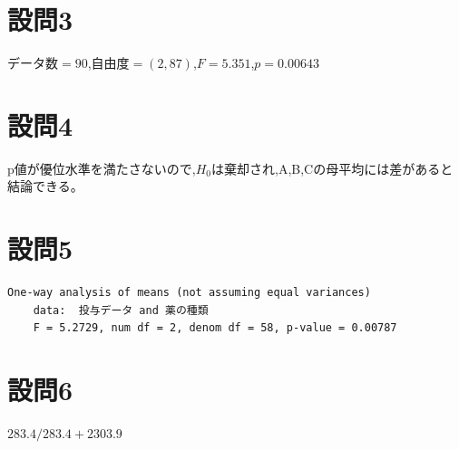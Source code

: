 \documentclass[fontsize = 10pt, paper= a4,twocolumn,column_gap=5zw]{jlreq}
\begin{document}
\section{設問3}
$ データ数 = 90$,$自由度 = (2,87) $,$F = 5.351$,$ p = 0.00643$

\section{設問4}
p値が優位水準を満たさないので,${H_0}$は棄却され,A,B,Cの母平均には差があると結論できる。

\section{設問5}
\begin{lstlisting}[basicstyle=\ttfamily\footnotesize, frame=single, caption=s2212022-1.c ,label=s2212022-1.c]
    One-way analysis of means (not assuming equal variances)
    data:  投与データ and 薬の種類
    F = 5.2729, num df = 2, denom df = 58, p-value = 0.00787
\end{lstlisting}


\section{設問6}
$283.4/283.4+2303.9$
\end{document}
